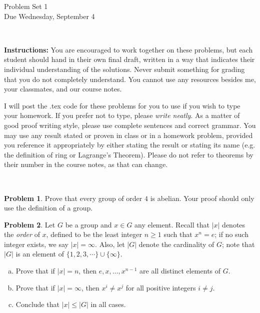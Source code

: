 \documentclass[11pt]{article}
\title{}
\date{\vspace{-0.5in}}
\theoremstyle{definition}
\newtheorem{problem}{Problem}
\begin{document}
\thispagestyle{fancy}
\pagestyle{fancy}

\vspace{3em}

\begin{center}
	{\LARGE Problem Set 1 \\}
	Due Wednesday, September 4
\end{center}

\

\noindent
{\bf Instructions:}
You are encouraged to work together on these problems, but each student should hand in their own final draft, written in a way that indicates their individual understanding of the solutions. Never submit something for grading that you do not completely understand. You cannot use any resources besides me, your classmates, and our course notes.


I will post the .tex code for these problems for you to use if you wish to type your homework. If you prefer not to type, please  {\em write neatly}. As a matter of good proof writing style, please use complete sentences and correct grammar. You may use any result  stated or proven in class or in a homework problem, provided you reference it appropriately by either stating the result or stating its name (e.g. the definition of ring or Lagrange's Theorem). Please do not refer to theorems by their number in the course notes, as that can change.


\

\begin{problem}
Prove that every group of order $4$ is abelian. Your proof should only use the definition of a group. 
\end{problem}

\begin{problem}
Let $G$ be a group and $x \in G$ any element. 
Recall that $|x|$ denotes the {\em order} of $x$, defined to be the least integer $n \geqslant 1$ such that $x^n = e$; if no such integer exists, we say $|x| = \infty$.
Also, let $|G|$ denote the cardinality of $G$; note that $|G|$ is an element of $\{1, 2, 3, \cdots \} \cup \{\infty\}$.

\begin{enumerate}[(a)]

\item Prove that if $|x| = n$, then $e, x, \dots, x^{n-1}$ are all distinct elements of $G$.

\item Prove that if $|x| = \infty$, then $x^i \neq x^j$ for all positive integers $i \neq j$. 

\item Conclude that $|x| \leqslant |G|$ in all cases. 
\end{enumerate}
\end{problem} 
\end{document}
